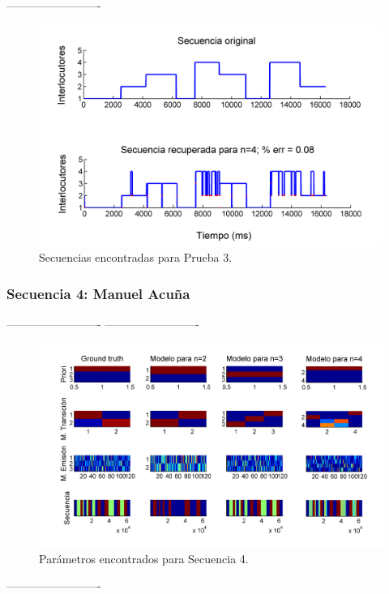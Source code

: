 -------------------------

\begin{figure}[H]
  \centerline
  {\includegraphics[width=0.8\linewidth]{gfx/chap6/lear31_}} \quad
  \caption{Secuencias encontradas para Prueba 3.}
  \label{fig:prb1_seq}
\end{figure}

\newpage
\subsubsection{Secuencia 4: Manuel Acuña}

-------------------------
-------------------------

\begin{figure}[H]
  \centerline
  {\includegraphics[width=1.3\linewidth]{gfx/chap6/noct1}} \quad
  \caption{Parámetros encontrados para Secuencia 4.}
  \label{fig:prb1_par}
\end{figure}

-------------------------

